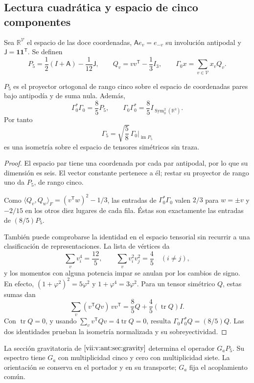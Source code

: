 \subsection{Lectura cuadrática y espacio de cinco componentes}
Sea \(\mathbb R^{\mathcal V}\) el espacio de las doce coordenadas,
\(\mathsf A e_v=e_{-v}\) su involución antipodal y
\(\mathsf J=\mathbf1\mathbf1^{\mathsf T}\). Se definen
\[
 P_5=\frac12(I+\mathsf A)-\frac1{12}\mathsf J,\qquad
 Q_v=vv^{\mathsf T}-\frac13I_3,\qquad
 \Gamma_0x=\sum_{v\in\mathcal V}x_vQ_v.
\]
\begin{theorem}
\label{vii:vii:thm:portador-pentacomponente}
\(P_5\) es el proyector ortogonal de rango cinco sobre el espacio de
coordenadas pares bajo antipodía y de suma nula. Además,
\[
 \Gamma_0^*\Gamma_0=\frac85P_5,\qquad
 \Gamma_0\Gamma_0^*=\frac85I_{\operatorname{Sym}^2_0(\mathbb R^3)}.
\]
Por tanto
\[
 \Gamma_5=\sqrt{\frac58}\,\Gamma_0|_{\operatorname{im}P_5}
\]
es una isometría sobre el espacio de tensores simétricos sin traza.
\end{theorem}
\begin{proof}
El espacio par tiene una coordenada por cada par antipodal, por lo que
su dimensión es seis. El vector constante pertenece a él; restar su
proyector de rango uno da \(P_5\), de rango cinco.

Como
\(\langle Q_v,Q_w\rangle_F=(v^{\mathsf T}w)^2-1/3\), las entradas
de \(\Gamma_0^*\Gamma_0\) valen \(2/3\) para \(w=\pm v\) y
\(-2/15\) en los otros diez lugares de cada fila. Éstas son
exactamente las entradas de \((8/5)P_5\).

También puede comprobarse la identidad en el espacio tensorial sin
recurrir a una clasificación de representaciones. La lista de vértices da
\[
 \sum_vv_i^4=\frac{12}{5},\qquad
 \sum_vv_i^2v_j^2=\frac45\quad(i\ne j),
\]
y los momentos con alguna potencia impar se anulan por los cambios de
signo. En efecto,
\((1+\varphi^2)^2=5\varphi^2\) y \(1+\varphi^4=3\varphi^2\).
Para un tensor simétrico \(Q\), estas sumas dan
\[
 \sum_v(v^{\mathsf T}Qv)\,vv^{\mathsf T}
 =\frac85Q+\frac45(\operatorname{tr}Q)I.
\]
Con \(\operatorname{tr}Q=0\), y usando
\(\sum_vv^{\mathsf T}Qv=4\operatorname{tr}Q=0\), resulta
\(\Gamma_0\Gamma_0^*Q=(8/5)Q\). Las dos identidades prueban
la isometría normalizada y su sobreyectividad.
\end{proof}

La sección gravitatoria de \(\ref{vii:v:ant:sec:gravity}\) determina el
operador \(G_aP_5\). Su espectro tiene \(G_a\) con multiplicidad
cinco y cero con multiplicidad siete. La orientación se conserva en
el portador y en su transporte; \(G_a\) fija el acoplamiento común.

